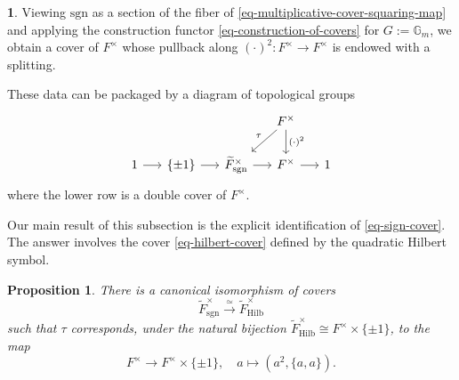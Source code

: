 \documentclass[10pt,english,reqno]{amsart}
\newcommand{\sgn}{\mathrm{sgn}}
\newcommand{\Hilbert}{\mathrm{Hilb}}
\newtheorem{prop}[subsubsection]{Proposition}
\theoremstyle{definition}
\numberwithin{equation}{section}
\newtheorem{untitledsubsubsection}[subsubsection]{}
\newenvironment{void}
{\begin{untitledsubsubsection}}
{\end{untitledsubsubsection}}
\begin{document}

\begin{void}
Viewing $\sgn$ as a section of the fiber of \eqref{eq-multiplicative-cover-squaring-map} and applying the construction functor \eqref{eq-construction-of-covers} for $G := \mathbb G_m$, we obtain a cover of $F^{\times}$ whose pullback along $(\cdot)^2 : F^{\times} \rightarrow F^{\times}$ is endowed with a splitting.

These data can be packaged by a diagram of topological groups
\begin{equation}
\label{eq-sign-cover}
\begin{tikzcd}[column sep = 1.5em]
	& & & F^{\times} \ar[d, "(\cdot)^2"]\ar[dl, swap, "\tau"] \\
	1 \ar[r] & \{\pm 1\} \ar[r] & \widetilde F^{\times}_{\sgn} \ar[r] & F^{\times} \ar[r] & 1
\end{tikzcd}
\end{equation}
where the lower row is a double cover of $F^{\times}$.

Our main result of this subsection is the explicit identification of \eqref{eq-sign-cover}. The answer involves the cover \eqref{eq-hilbert-cover} defined by the quadratic Hilbert symbol.
\end{void}


\begin{prop}
\label{prop-sign-cover-identification}
There is a canonical isomorphism of covers
\begin{equation}
\label{eq-sign-cover-isomorphism-hilbert-cover}
\widetilde F^{\times}_{\sgn} \xrightarrow{\simeq} \widetilde F^{\times}_{\Hilbert}
\end{equation}
such that $\tau$ corresponds, under the natural bijection $\widetilde F^{\times}_{\Hilbert} \cong F^{\times} \times \{\pm 1\}$, to the map
$$
F^{\times} \rightarrow F^{\times} \times\{\pm 1\},\quad a\mapsto (a^2, \{a, a\}).
$$
\end{prop}

\end{document}
